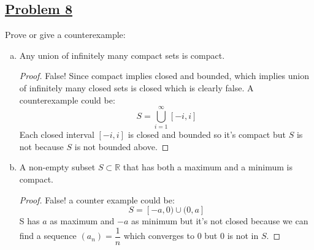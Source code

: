 \documentclass[10pt,letterpaper]{article}
\begin{document}
	\subsection*{{\color{purple}\underline{Problem 8}}}
	Prove or give a counterexample:
	\begin{enumerate}[(a)]
	\item Any union of infinitely many compact sets is compact.
	\begin{proof}
	False! Since compact implies closed and bounded, which implies
	union of infinitely many closed sets is closed which is clearly false.
	A counterexample could be:
		$$S = \displaystyle\bigcup_{i = 1}^{\infty}[-i, i]$$
	Each closed interval $[-i, i]$ is closed and bounded so it's compact but
	$S$ is not because $S$ is not bounded above.
		
	\end{proof}
	\item A non-empty subset $S \subset \mathbb{R}$ that has both a maximum and a minimum is compact.
	\begin{proof}
		False! a counter example could be:
		$$S = [-a, 0) \cup (0, a]$$
		S has $a$ as maximum and $-a$ as minimum but it's not closed because we can find a
		sequence $(a_n) = \dfrac{1}{n}$ which converges to $0$ but $0$ is not in $S$.
	\end{proof}		
	
	
	
	\end{enumerate}
	
\end{document}
